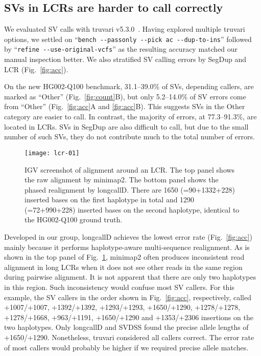 \documentclass[a4paper,num-refs]{oup-contemporary}
\begin{document}
\subsection{SVs in LCRs are harder to call correctly}

We evaluated SV calls with truvari v5.3.0~\cite{English:2022aa}.
Having explored multiple truvari options,
we settled on ``{\tt bench -{}-passonly -{}-pick ac -{}-dup-to-ins}''
followed by ``{\tt refine -{}-use-original-vcfs}''
as the resulting accuracy matched our manual inspection better.
We also stratified SV calling errors by SegDup and LCR (Fig.~\ref{fig:acc}).

On the new HG002-Q100 benchmark, 31.1--39.0\% of SVs, depending callers, are marked as ``Other'' (Fig.~\ref{fig:count}B),
but only 5.2--14.0\% of SV errors come from ``Other'' (Fig.~\ref{fig:acc}A and \ref{fig:acc}B).
This suggests SVs in the Other category are easier to call.
In contrast, the majority of errors, at 77.3--91.3\%, are located in LCRs.
SVs in SegDup are also difficult to call, but due to the small number of such SVs,
they do not contribute much to the total number of errors.

\begin{figure}[tb]
\texttt{[image: lcr-01]}
\caption{IGV screenshot of alignment around an LCR.
The top panel shows the raw alignment by minimap2.
The bottom panel shows the phased realignment by longcallD.
There are 1650 (=90+1332+228) inserted bases on the first haplotype in total
and 1290 (=72+990+228) inserted bases on the second haplotype,
identical to the HG002-Q100 ground truth.
}\label{fig:ex}
\end{figure}

Developed in our group, longcallD achieves the lowest error rate (Fig.~\ref{fig:acc})
mainly because it performs haplotype-aware multi-sequence realignment.
As is shown in the top panel of Fig.~\ref{fig:ex}, minimap2 often produces inconsistent read alignment in long LCRs
when it does not see other reads in the same region during pairwise alignment.
It is not apparent that there are only two haplotypes in this region.
Such inconsistency would confuse most SV callers.
For this example, the SV callers in the order shown in Fig.~\ref{fig:acc}, respectively, called
+1007/+1007, +1392/+1392, +1293/+1293, +1650/+1290, +1278/+1278,
+1278/+1668, +963/+1191, +1650/+1290 and +1353/+2306 insertions on the two haplotypes.
Only longcallD and SVDSS found the precise allele lengths of +1650/+1290.
Nonetheless, truvari considered all callers correct.
The error rate of most callers would probably be higher if we required precise allele matches.
\end{document}
